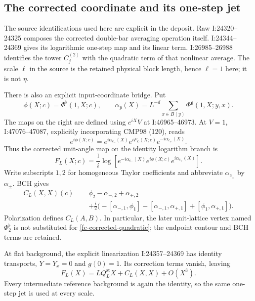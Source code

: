 \documentclass[11pt]{article}
\theoremstyle{remark}
\begin{document}
\subsection{The corrected coordinate and its one-step jet}
\label{fc-coordinate-section}

The source identifications used here are explicit in the deposit.
Raw I:24320--24325 composes the corrected double-bar averaging
operation itself. I:24344--24369 gives its logarithmic one-step
map and its linear term. I:26985--26988 identifies the tower
$C_j^{(2)}$ with the quadratic term of that nonlinear average.
The scale $\ell$ in the source is the retained physical block
length, hence $\ell=1$ here; it is not $\eta$.

There is also an explicit input-coordinate bridge. Put
\[
 \phi(X;c)=\Phi^{\flat}(1,X;c),\qquad
 \alpha_y(X)=L^{-d}\sum_{x\in B(y)}
                  \Phi^{\mathfrak g}(1,X;y,x).
\]
The maps on the right are defined using $e^{iX}V$ at
I:46965--46973. At $V=1$, I:47076--47087, explicitly incorporating
CMP98 (120), reads
\[
 e^{i\phi(X;c)}=e^{i\alpha_{c_-}(X)}e^{iF_L(X;c)}
                                  e^{-i\alpha_{c_+}(X)}.
\]
Thus the corrected unit-angle map on the identity logarithm branch is
\begin{equation}
 F_L(X;c)=\frac1i\log\!\left[
 e^{-i\alpha_{c_-}(X)}e^{i\phi(X;c)}e^{i\alpha_{c_+}(X)}\right].
 \label{fc-corrected-map}
\end{equation}
Write subscripts $1,2$ for homogeneous Taylor coefficients and
abbreviate $\alpha_{c_\pm}$ by $\alpha_\pm$. BCH gives
\begin{equation}
 \begin{split}
 C_L(X,X)(c)={}&\phi_2-\alpha_{-,2}+\alpha_{+,2}\\
 &+\frac i2\bigl(-[\alpha_{-,1},\phi_1]
                 -[\alpha_{-,1},\alpha_{+,1}]
                 +[\phi_1,\alpha_{+,1}]\bigr).
 \end{split}
 \label{fc-corrected-quadratic}
\end{equation}
Polarization defines $C_L(A,B)$. In particular, the later
unit-lattice vertex named $\Phi^{\flat}_2$ is not substituted for
\eqref{fc-corrected-quadratic}; the endpoint contour and BCH terms
are retained.

At flat background, the explicit linearization I:24357--24369 has
identity transports, $Y=Y_x=0$ and $g(0)=1$. Its correction terms
vanish, leaving
\begin{equation}
 F_L(X)=LQ_L^{\mathrm{st}}X+C_L(X,X)+O(X^3).
 \label{fc-unit-jet}
\end{equation}
Every intermediate reference background is again the identity, so
the same one-step jet is used at every scale.
\end{document}
